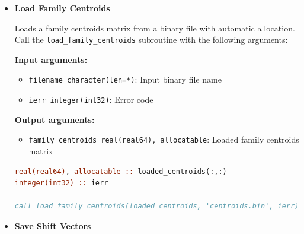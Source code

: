 \begin{enumerate}
\begin{itemize}
\begin{itemize}
                    \item \texttt{filename character(len=*)}: Output binary file name
                          
                    \item \texttt{ierr integer(int32)}: Error code
                  \end{itemize}
                  \begin{lstlisting}[language=Fortran, caption={Save Family Centroids}]
real(real64) :: centroids(67, 15512)
integer(int32) :: ierr

call save_family_centroids(centroids, 'centroids.bin', ierr)
                  \end{lstlisting}
                  
            \item \textbf{Load Family Centroids}
                  
                  Loads a family centroids matrix from a binary file with automatic allocation.
                  Call the \texttt{load\_family\_centroids} subroutine with the following
                  arguments:
                  
                  \textbf{Input arguments:}
                  \begin{itemize}
                    \item \texttt{filename character(len=*)}: Input binary file name
                          
                    \item \texttt{ierr integer(int32)}: Error code
                  \end{itemize}
                  \textbf{Output arguments:}
                  \begin{itemize}
                    \item \texttt{family\_centroids real(real64), allocatable}: Loaded family
                          centroids matrix
                  \end{itemize}
                  \begin{lstlisting}[language=Fortran, caption={Load Family Centroids}]
real(real64), allocatable :: loaded_centroids(:,:)
integer(int32) :: ierr

call load_family_centroids(loaded_centroids, 'centroids.bin', ierr)
                  \end{lstlisting}
                  
            \item \textbf{Save Shift Vectors}
                  

\end{itemize}
\end{enumerate}
